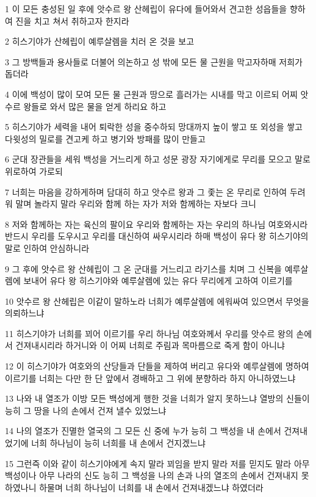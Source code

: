 \par 1 이 모든 충성된 일 후에 앗수르 왕 산헤립이 유다에 들어와서 견고한 성읍들을 향하여 진을 치고 쳐서 취하고자 한지라
\par 2 히스기야가 산헤립이 예루살렘을 치러 온 것을 보고
\par 3 그 방백들과 용사들로 더불어 의논하고 성 밖에 모든 물 근원을 막고자하매 저희가 돕더라
\par 4 이에 백성이 많이 모여 모든 물 근원과 땅으로 흘러가는 시내를 막고 이르되 어찌 앗수르 왕들로 와서 많은 물을 얻게 하리요 하고
\par 5 히스기야가 세력을 내어 퇴락한 성을 중수하되 망대까지 높이 쌓고 또 외성을 쌓고 다윗성의 밀로를 견고케 하고 병기와 방패를 많이 만들고
\par 6 군대 장관들을 세워 백성을 거느리게 하고 성문 광장 자기에게로 무리를 모으고 말로 위로하여 가로되
\par 7 너희는 마음을 강하게하며 담대히 하고 앗수르 왕과 그 좇는 온 무리로 인하여 두려워 말며 놀라지 말라 우리와 함께 하는 자가 저와 함께하는 자보다 크니
\par 8 저와 함께하는 자는 육신의 팔이요 우리와 함께하는 자는 우리의 하나님 여호와시라 반드시 우리를 도우시고 우리를 대신하여 싸우시리라 하매 백성이 유다 왕 히스기야의 말로 인하여 안심하니라
\par 9 그 후에 앗수르 왕 산헤립이 그 온 군대를 거느리고 라기스를 치며 그 신복을 예루살렘에 보내어 유다 왕 히스기야와 예루살렘에 있는 유다 무리에게 고하여 이르기를
\par 10 앗수르 왕 산헤립은 이같이 말하노라 너희가 예루살렘에 에워싸여 있으면서 무엇을 의뢰하느냐
\par 11 히스기야가 너희를 꾀어 이르기를 우리 하나님 여호와께서 우리를 앗수르 왕의 손에서 건져내시리라 하거니와 이 어찌 너희로 주림과 목마름으로 죽게 함이 아니냐
\par 12 이 히스기야가 여호와의 산당들과 단들을 제하여 버리고 유다와 예루살렘에 명하여 이르기를 너희는 다만 한 단 앞에서 경배하고 그 위에 분향하라 하지 아니하였느냐
\par 13 나와 내 열조가 이방 모든 백성에게 행한 것을 너희가 알지 못하느냐 열방의 신들이 능히 그 땅을 나의 손에서 건져 낼수 있었느냐
\par 14 나의 열조가 진멸한 열국의 그 모든 신 중에 누가 능히 그 백성을 내 손에서 건져내었기에 너희 하나님이 능히 너희를 내 손에서 건지겠느냐
\par 15 그런즉 이와 같이 히스기야에게 속지 말라 꾀임을 받지 말라 저를 믿지도 말라 아무 백성이나 아무 나라의 신도 능히 그 백성을 나의 손과 나의 열조의 손에서 건져내지 못하였나니 하물며 너희 하나님이 너희를 내 손에서 건져내겠느냐 하였더라
